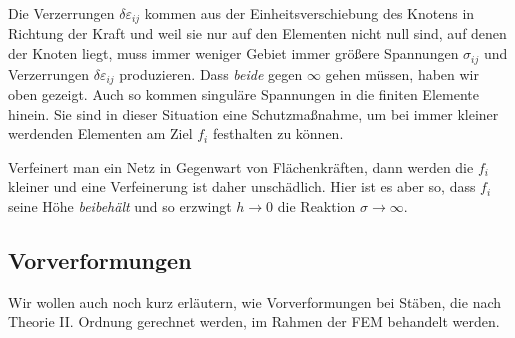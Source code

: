 {{{{{{Die Verzerrungen $\delta \varepsilon_{ij}$ kommen aus der Einheitsverschiebung des Knotens in Richtung der Kraft und weil sie nur auf den Elementen nicht null sind, auf denen der Knoten liegt, muss immer weniger Gebiet immer gr\"{o}{\ss}ere Spannungen $\sigma_{ij}$ und Verzerrungen $\delta \varepsilon_{ij}$ produzieren. Dass {\em beide\/} gegen $\infty$ gehen m\"{u}ssen, haben wir oben gezeigt. Auch so kommen singul\"{a}re Spannungen in die finiten Elemente hinein. Sie sind in dieser Situation eine \glq Schutzma{\ss}nahme\grq{}, um bei immer kleiner werdenden Elementen am Ziel $f_i$ festhalten zu k\"{o}nnen.

Verfeinert man ein Netz in Gegenwart von Fl\"{a}chenkr\"{a}ften, dann werden die $f_i$ kleiner und  eine Verfeinerung ist daher unsch\"{a}dlich. Hier ist es aber so, dass $f_i$ seine H\"{o}he {\em beibeh\"{a}lt\/} und so erzwingt $h \to 0$ die Reaktion $\sigma \to \infty$.

\textcolor{sectionTitleBlue}{\section{Vorverformungen}}\label{Korrektur42}
Wir wollen auch noch kurz erl\"{a}utern, wie Vorverformungen bei St\"{a}ben, die nach Theorie II. Ordnung gerechnet werden, im Rahmen der FEM behandelt werden.

}}}}}}
